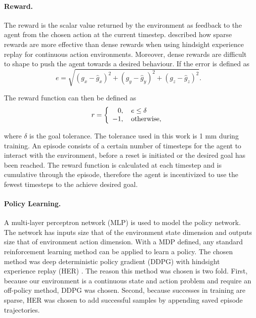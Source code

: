 \paragraph{Reward.} The reward is the scalar value returned by the environment as feedback to the agent from the chosen action at the current timestep. \cite{andrychowicz2017hindsight} described how sparse rewards are more effective than dense rewards when using hindsight experience replay for continuous action environments. Moreover, dense rewards are difficult to shape to push the agent towards a desired behaviour. If the error is defined as
\begin{equation}
e = \sqrt{(g_x - \hat{g}_x)^2 + (g_y - \hat{g}_y)^2 + (g_z - \hat{g}_z)^2}. \label{eqn:error}
\end{equation}

The reward function can then be defined as
\begin{equation}
r =
  \left\{
    \begin{array}{l}
      \hphantom{-}0, \quad e \leq \delta \\
      -1, \quad \textnormal{otherwise},
    \end{array}
  \right. \label{eqn:reward}
\end{equation}

where $\delta$ is the goal tolerance. The tolerance used in this work is 1 mm during training. An episode consists of a certain number of timesteps for the agent to interact with the environment, before a reset is initiated or the desired goal has been reached. The reward function is calculated at each timestep and is cumulative through the episode, therefore the agent is incentivized to use the fewest timesteps to the achieve desired goal.

\paragraph{Policy Learning.} A multi-layer perceptron network (MLP) is used to model the policy network. The network has inputs size that of the environment state dimension and outputs size that of environment action dimension. With a MDP defined, any standard reinforcement learning method can be applied to learn a policy. The chosen method was deep deterministic policy gradient (DDPG) \cite{Lillicrap2015} with hindsight experience replay (HER) \cite{andrychowicz2017hindsight}. The reason this method was chosen is two fold. First, because our environment is a continuous state and action problem and require an off-policy method, DDPG was chosen. Second, because successes in training are sparse, HER was chosen to add successful samples by appending saved episode trajectories.

